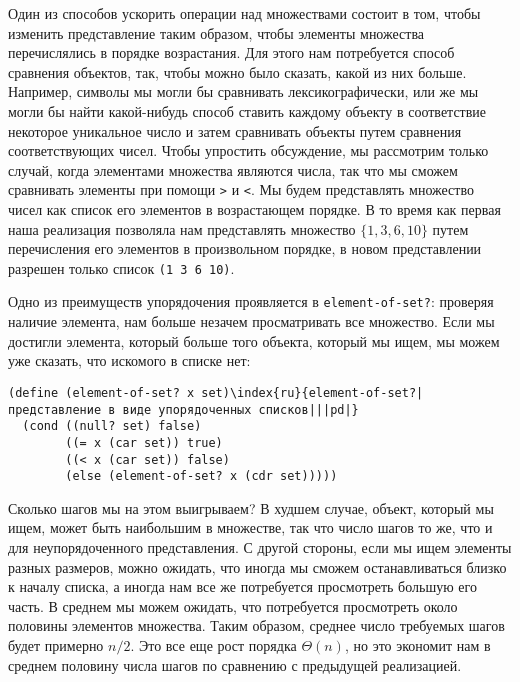 Один из способов ускорить операции над множествами
состоит в том, чтобы изменить представление таким образом, чтобы
элементы множества перечислялись в порядке возрастания.  Для этого
нам потребуется способ сравнения объектов, так, чтобы
можно было сказать, какой из них больше.  Например, символы мы могли
бы сравнивать лексикографически, или же мы могли бы найти какой-нибудь 
способ ставить каждому объекту в соответствие некоторое уникальное
число и затем сравнивать объекты путем сравнения соответствующих
чисел.  Чтобы упростить обсуждение, мы рассмотрим только случай, когда 
элементами множества являются числа, так что мы сможем сравнивать
элементы при помощи {\tt >} и {\tt <}.  Мы будем 
представлять множество чисел как список его элементов в возрастающем
порядке.  В то время как первая наша реализация позволяла нам
представлять множество $\{1, 3, 6, 10\}$ путем перечисления 
его элементов в произвольном порядке, в новом представлении разрешен
только список {\tt (1 3 6 10)}.

Одно из преимуществ упорядочения проявляется в
{\tt element-of-set?}: проверяя наличие элемента, нам больше
незачем просматривать все множество.  Если мы достигли элемента,
который больше того объекта, который мы ищем, мы можем уже сказать,
что искомого в списке нет:

\begin{Verbatim}[fontsize=\small]
(define (element-of-set? x set)\index{ru}{element-of-set?|представление в виде упорядоченных списков|||pd|}
  (cond ((null? set) false)
        ((= x (car set)) true)
        ((< x (car set)) false)
        (else (element-of-set? x (cdr set)))))
\end{Verbatim}
Сколько шагов мы на этом выигрываем? В худшем случае, объект, который
мы ищем, может быть наибольшим в множестве, так что число шагов то же, 
что и для неупорядоченного представления.  С другой стороны, если мы
ищем элементы разных размеров, можно ожидать, что иногда мы сможем
останавливаться близко к началу списка, а иногда нам все же
потребуется просмотреть большую его часть.  В среднем мы можем
ожидать, что потребуется просмотреть около половины элементов
множества.  Таким образом, среднее число требуемых шагов будет
примерно $n / 2$. Это все еще рост порядка $\Theta 
(n)$, но это экономит нам в среднем половину числа шагов по 
сравнению с предыдущей реализацией.

